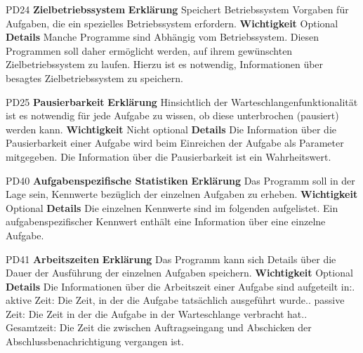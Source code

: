 \documentclass[a4paper,12pt]{article}
\begin{document}
\begin{itemize}[nosep]
\begin{minipage}[t]{\linewidth}
\item[PD24] \textbf{Zielbetriebssystem}
\subitem \textbf{Erklärung} Speichert Betriebssystem Vorgaben für Aufgaben, die ein spezielles Betriebssystem erfordern.
\subitem \textbf{Wichtigkeit} Optional
\subitem \textbf{Details} Manche Programme sind Abhängig vom Betriebssystem. Diesen Programmen soll daher ermöglicht werden, auf ihrem gewünschten Zielbetriebssystem zu laufen. Hierzu ist es notwendig, Informationen über besagtes Zielbetriebssystem zu speichern.
\end{minipage}
\pagebreak

\begin{minipage}[t]{\linewidth}
\item[PD25] \textbf{Pausierbarkeit}
\subitem \textbf{Erklärung} Hinsichtlich der Warteschlangenfunktionalität ist es notwendig für jede Aufgabe zu wissen, ob diese unterbrochen (pausiert) werden kann.
\subitem \textbf{Wichtigkeit} Nicht optional
\subitem \textbf{Details} Die Information über die Pausierbarkeit einer Aufgabe wird beim Einreichen der Aufgabe als Parameter mitgegeben.\newline
Die Information über die Pausierbarkeit ist ein Wahrheitswert.
\end{minipage}
\pagebreak

\begin{minipage}[t]{\linewidth}
\item[PD40] \textbf{Aufgabenspezifische Statistiken}
\subitem \textbf{Erklärung} Das Programm soll in der Lage sein, Kennwerte bezüglich der einzelnen Aufgaben zu erheben.
\subitem \textbf{Wichtigkeit} Optional
\subitem \textbf{Details} Die einzelnen Kennwerte sind im folgenden aufgelistet.\newline
Ein aufgabenspezifischer Kennwert enthält eine Information über eine einzelne Aufgabe.
\end{minipage}
\pagebreak

\begin{minipage}[t]{\linewidth}
\item[PD41] \textbf{Arbeitszeiten}
\subitem \textbf{Erklärung} Das Programm kann sich Details über die Dauer der Ausführung der einzelnen Aufgaben speichern.
\subitem \textbf{Wichtigkeit} Optional
\subitem \textbf{Details} Die Informationen über die Arbeitszeit einer Aufgabe sind aufgeteilt in:. aktive Zeit: Die Zeit, in der die Aufgabe tatsächlich ausgeführt wurde.. passive Zeit: Die Zeit in der die Aufgabe in der Warteschlange verbracht hat.. Gesamtzeit: Die Zeit die zwischen Auftragseingang und Abschicken der Abschlussbenachrichtigung vergangen ist.
\end{minipage}
\pagebreak


\end{itemize}
\end{document}
